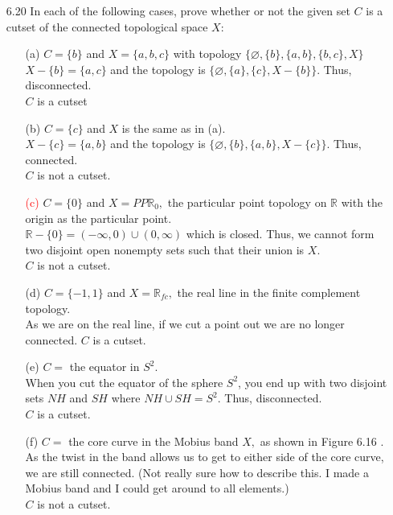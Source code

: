 \documentclass[12pt]{article}
\newcommand{\R}{\mathbb{R}}
\begin{document}
\begin{enumerate}
		\item[6.20] In each of the following cases, prove whether or not the given set $C$ is a cutset of the connected topological space $X :$
		\begin{enumerate}
			\item[(a)] $C = \{ b \}$ and $X = \{ a , b , c \}$ with topology $\{ \varnothing , \{ b \} , \{ a , b \} , \{ b , c \} , X \}$\\
			$ X - \{b\} = \{a,c\}$ and the topology is $\{\varnothing,\{a\},\{c\},X-\{b\}\} $. Thus, disconnected.\\
			$ C $ is a cutset
			\item[(b)] $C = \{ c \}$ and $X$ is the same as in (a).\\
			$ X-\{c\}=\{a,b\} $ and the topology is $ \{\varnothing, \{b\},\{a,b\},X-\{c\}\} $. Thus, connected.\\
			$ C $ is not a cutset.
			\item[\textcolor{red}{(c)}] $C = \{ 0 \}$ and $X = P P \mathbb { R } _ { 0 } ,$ the particular point topology on $\mathbb { R }$ with the origin as the particular point.\\
			$ \R  -\{0\} = (-\infty,0)\cup(0,\infty)$ which is closed. Thus, we cannot form two disjoint open nonempty sets such that their union is $ X $.\\ 
			$ C $ is not a cutset.
			\item[(d)]	$C = \{ - 1,1 \}$ and $X = \mathbb { R } _ { f c } ,$ the real line in the finite complement topology.\\
			As we are on the real line, if we cut a point out we are no longer connected.
			$ C $ is a cutset.
			\item[(e)] $C = $ the equator in $ S^2 $. \\
			When you cut the equator of the sphere $ S^2 $, you end up with two disjoint sets $ NH $ and $ SH $ where $ NH\cup SH = S^2$. Thus, disconnected.\\
			$ C $ is a cutset.
			\item[(f)] $C =$ the core curve in the Mobius band $X ,$ as shown in Figure 6.16 .\\
			As the twist in the band allows us to get to either side of the core curve, we are still connected. (Not really sure how to describe this. I made a Mobius band and I could get around to all elements.)\\
			$ C $ is not a cutset.
		\end{enumerate}
		

\end{enumerate}
\end{document}
